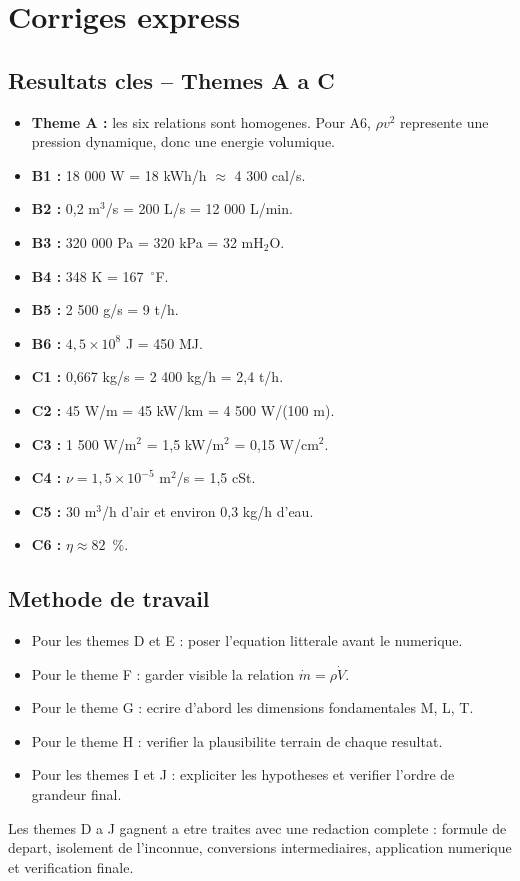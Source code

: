 \newpage
\section*{Corriges express}

\subsection*{Resultats cles -- Themes A a C}
\begin{itemize}[leftmargin=1.4em, itemsep=0.35em]
  \item \textbf{Theme A :} les six relations sont homogenes. Pour A6, $\rho v^2$ represente une pression dynamique, donc une energie volumique.
  \item \textbf{B1 :} 18 000 W = 18 kWh/h $\approx$ 4 300 cal/s.
  \item \textbf{B2 :} 0,2 m$^3$/s = 200 L/s = 12 000 L/min.
  \item \textbf{B3 :} 320 000 Pa = 320 kPa = 32 mH$_2$O.
  \item \textbf{B4 :} 348 K = 167~$^\circ$F.
  \item \textbf{B5 :} 2 500 g/s = 9 t/h.
  \item \textbf{B6 :} $4{,}5 \times 10^8$ J = 450 MJ.
  \item \textbf{C1 :} 0,667 kg/s = 2 400 kg/h = 2,4 t/h.
  \item \textbf{C2 :} 45 W/m = 45 kW/km = 4 500 W/(100 m).
  \item \textbf{C3 :} 1 500 W/m$^2$ = 1,5 kW/m$^2$ = 0,15 W/cm$^2$.
  \item \textbf{C4 :} $\nu = 1{,}5 \times 10^{-5}$ m$^2$/s = 1,5 cSt.
  \item \textbf{C5 :} 30 m$^3$/h d'air et environ 0,3 kg/h d'eau.
  \item \textbf{C6 :} $\eta \approx 82$~\%.
\end{itemize}

\subsection*{Methode de travail}
\begin{itemize}[leftmargin=1.4em, itemsep=0.35em]
  \item Pour les themes D et E : poser l'equation litterale avant le numerique.
  \item Pour le theme F : garder visible la relation $\dot{m} = \rho \dot{V}$.
  \item Pour le theme G : ecrire d'abord les dimensions fondamentales M, L, T.
  \item Pour le theme H : verifier la plausibilite terrain de chaque resultat.
  \item Pour les themes I et J : expliciter les hypotheses et verifier l'ordre de grandeur final.
\end{itemize}

\begin{attention}
Les themes D a J gagnent a etre traites avec une redaction complete : formule de depart, isolement de l'inconnue, conversions intermediaires, application numerique et verification finale.
\end{attention}
